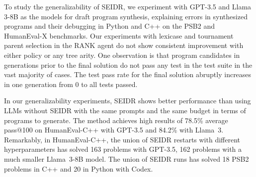 To study the generalizability of SEIDR, we experiment with GPT-3.5 and Llama 3-8B as the models for draft program synthesis, explaining errors in synthesized programs and their debugging in Python and C++ on the PSB2 and HumanEval-X benchmarks. 
Our experiments with lexicase and tournament parent selection in the RANK agent do not show consistent improvement with either policy or any tree arity. 
One observation is that program candidates in generations prior to the final solution do not pass any test in the test suite in the vast majority of cases. 
The test pass rate for the final solution abruptly increases in one generation from 0 to all tests passed. 

In our generalizability experiments, SEIDR shows better performance than using LLMs without SEIDR with the same prompts and the same budget in terms of programs to generate.
The method achieves high results of 78.5\% average pass@100 on HumanEval-C++ with GPT-3.5 and 84.2\% with Llama~3.
Remarkably, in HumanEval-C++, the union of SEIDR restarts with different hyperparameters has solved 163 problems with GPT-3.5, 162 problems with a much smaller Llama~3-8B model.
The union of SEIDR runs has solved 18 PSB2 problems in C++ and 20 in Python with Codex. 

